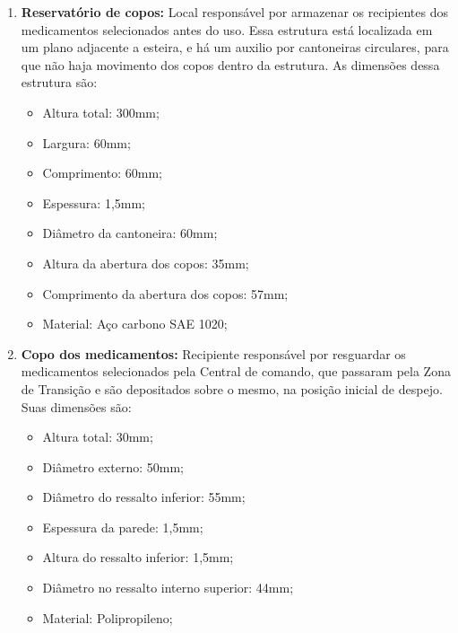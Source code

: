 \begin{enumerate}
\item \textbf{Reservatório de copos:} Local responsável por armazenar os recipientes dos medicamentos selecionados antes do uso. Essa estrutura está localizada em um plano adjacente a esteira, e há um auxilio por cantoneiras circulares, para que não haja movimento dos copos dentro da estrutura. As dimensões dessa estrutura são:
\begin{itemize}
    \item Altura total: 300mm;
    \item Largura: 60mm;
    \item Comprimento: 60mm;
    \item Espessura: 1,5mm;
    \item Diâmetro da cantoneira: 60mm;
    \item Altura da abertura dos copos: 35mm;
    \item Comprimento da abertura dos copos: 57mm;
    \item Material: Aço carbono SAE 1020;
\end{itemize}
\item \textbf{Copo dos medicamentos:} Recipiente responsável por resguardar os medicamentos selecionados pela Central de comando, que passaram pela Zona de Transição e são depositados sobre o mesmo, na posição inicial de despejo. Suas dimensões são:
\begin{itemize}
    \item Altura total: 30mm;
    \item Diâmetro externo: 50mm;
    \item Diâmetro do ressalto inferior: 55mm;
    \item Espessura da parede: 1,5mm;
    \item Altura do ressalto inferior: 1,5mm; 
    \item Diâmetro no ressalto interno superior: 44mm;
    \item Material: Polipropileno;
\end{itemize}


\end{enumerate}
